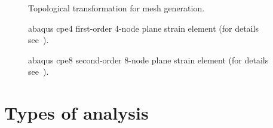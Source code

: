 \documentclass[a4paper, twoside,12pt, abstract]{scrartcl} %
\begin{document}
\begin{figure}[!h]
\centering
  \caption{Topological transformation for mesh generation.}
  \label{fig:topo_transf}
\end{figure}

\clearpage

\begin{figure}[!h]
\centering
  \caption{\gls{abaqus} \gls{cpe4} first-order 4-node plane strain element (for details see~\cite{ABAQUS2013}).}
  \label{fig:abaqus_cpe4}
\end{figure}

\begin{figure}[!h]
\centering
  \caption{\gls{abaqus} \gls{cpe8} second-order 8-node plane strain element (for details see~\cite{ABAQUS2013}).}
  \label{fig:abaqus_cpe8}
\end{figure}


\clearscrheadings
\pagestyle{scrheadings}
\manualmark
\ofoot{\\\pagemark} %
\ifoot{} %
\setheadtopline{2pt}
\setheadsepline{0.5pt}
\setfootsepline{0.5pt}

\section{Types of analysis}







%
%
%
\end{document}
